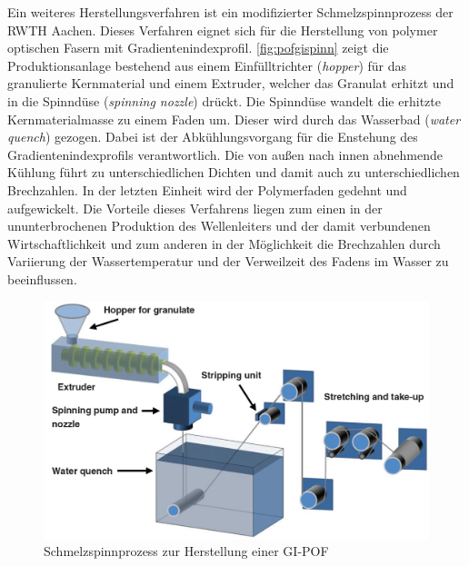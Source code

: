 Ein weiteres Herstellungsverfahren ist ein modifizierter Schmelzspinnprozess der
RWTH Aachen. Dieses Verfahren eignet sich für die Herstellung von polymer
optischen Fasern mit Gradientenindexprofil. \autoref{fig:pofgispinn} zeigt die
Produktionsanlage bestehend aus einem Einfülltrichter (\textit{hopper}) für das
granulierte Kernmaterial und einem Extruder, welcher das Granulat erhitzt und in
die Spinndüse (\textit{spinning nozzle}) drückt. Die Spinndüse wandelt die
erhitzte Kernmaterialmasse zu einem Faden um. Dieser wird durch das Wasserbad
(\textit{water quench}) gezogen. Dabei ist der Abkühlungsvorgang für die
Enstehung des Gradientenindexprofils verantwortlich. Die von außen nach innen
abnehmende Kühlung führt zu unterschiedlichen Dichten und damit auch zu
unterschiedlichen Brechzahlen. In der letzten Einheit wird der Polymerfaden
gedehnt und aufgewickelt. Die Vorteile dieses Verfahrens liegen zum einen in der
ununterbrochenen Produktion des Wellenleiters und der damit verbundenen
Wirtschaftlichkeit und zum anderen in der Möglichkeit die Brechzahlen durch
Variierung der Wassertemperatur und der Verweilzeit des Fadens im Wasser zu
beeinflussen. \cite{pofspinn}

\begin{figure}[h]
    \begin{center}
        \begin{minipage}[t]{\textwidth}
            \begin{center}
                \includegraphics[height=0.25\textheight]{Bilder/Optische_Wellenleiter_Die_Polymer_Optische_Faser/Herstellung/pofgispinn.png}
                \caption[Schmelzspinnprozess zur Herstellung einer GI-POF \newline \url{http://www.researchgate.net/publication/265646639_An_overview_on_fabrication_methods_for_polymer_optical_fibers} S. 9 (zuletzt aufgerufen am 28.09.2015)]{Schmelzspinnprozess zur Herstellung einer GI-POF}
                \label{fig:pofgispinn}
            \end{center}
        \end{minipage}
    \end{center}
\end{figure}
